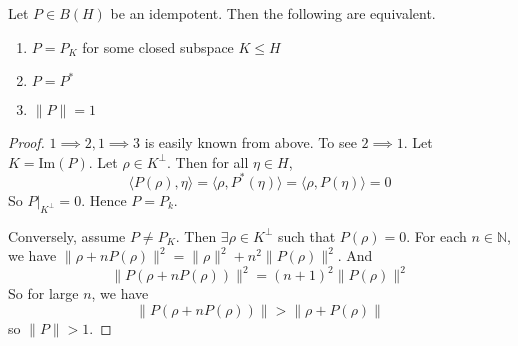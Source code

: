 \begin{theorem}
  Let $P \in B(H)$ be an idempotent. Then the following are equivalent.
  \begin{enumerate}[label=(\arabic*)]
    \item $P = P_K$ for some closed subspace $K \leqslant H$
    \item $P = P^*$
    \item $\|P\| = 1$
  \end{enumerate}
\end{theorem}
\begin{proof}
  $1 \implies 2, 1 \implies 3$ is easily known from above.
  To see $2 \implies 1$. Let $K = \textrm{Im}(P)$. Let $\rho \in
  K^\perp$. Then for all $\eta \in H$, \[
    \langle P(  \rho) ,  \eta \rangle  = \langle \rho ,  P^*(\eta)
    \rangle  = \langle \rho ,  P(\eta) \rangle = 0
  \]
  So $P|_{K^\perp} = 0$. Hence $P = P_k$.

  Conversely, assume $P \neq P_K$. Then $\exists \rho \in K^\perp$
  such that $P(\rho) = 0$. For each $n \in \mathbb{N}$, we have
  $\|\rho + n P(\rho)\|^2 = \|\rho\|^2 + n^2 \|P(\rho)\|^2$. And \[
    \|P(\rho + n P(\rho))\|^2 = (n+1)^2 \|P(\rho)\|^2
  \]
  So for large $n$, we have \[
    \|P(\rho + n P(\rho))\| > \|\rho + P(\rho)\|
  \]
  so $\|P\| > 1$.
\end{proof}


